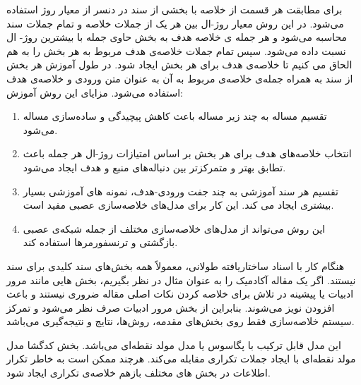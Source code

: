 برای مطابقت هر قسمت از خلاصه با بخشی از سند در دنسر از معیار روژ 
استفاده  ‌می‌شود. در این روش معیار روژ-ال بین هر یک از جملات خلاصه و تمام جملات سند محاسبه می‌شود و هر جمله ی خلاصه هدف به بخش حاوی جمله با بیشترین روژ- ال نسبت داده می‌شود. 
سپس تمام جملات خلاصه‌ی هدف مربوط به هر بخش را به هم الحاق می کنیم تا خلاصه‌ی هدف برای هر بخش ایجاد شود. در طول آموزش هر بخش از سند به همراه جمله‌ی خلاصه‌ی مربوط به آن به عنوان متن ورودی و خلاصه‌ی هدف استفاده می‌شود. 
مزایای این روش آموزش:
\begin{enumerate}
	\item {
		 تقسیم مساله به چند زیر مساله باعث کاهش پیچیدگی و ساده‌سازی مساله می‌شود.
	}
	\item {
		انتخاب خلاصه‌های هدف برای هر بخش بر اساس امتیازات روژ-ال هر جمله باعث تطابق بهتر و متمرکزتر بین دنباله‌های منبع و هدف ایجاد می‌شود.
	}
	\item {
تقسیم هر سند آموزشی به چند جفت ورودی-هدف، نمونه های آموزشی بسیار بیشتری ایجاد می کند. این کار برای مدل‌های خلاصه‌سازی عصبی مفید است. 	
}
	\item {
	این روش می‌تواند از مدل‌های خلاصه‌سازی مختلف از جمله شبکه‌ی عصبی بازگشتی و ترنسفورمرها استفاده کند.
}
\end{enumerate}


هنگام کار با اسناد ساختاریافته طولانی، معمولاً همه بخش‌های سند کلیدی برای سند نیستند. اگر یک مقاله آکادمیک را به عنوان مثال در نظر بگیریم، بخش هایی مانند مرور ادبیات یا پیشینه در تلاش برای خلاصه کردن نکات اصلی مقاله ضروری نیستند و باعث افزودن نویز می‌شوند. بنابراین از بخش مرور ادبیات صرف نظر می‌شود و تمرکز سیستم خلاصه‌سازی فقط  روی بخش‌های مقدمه، روش‌ها، نتایج و نتیجه‌گیری می‌باشد.

این مدل قابل ترکیب با پگاسوس یا مدل مولد نقطه‌ای 
می‌باشد.
بخش کدگشا مدل مولد نقطه‌ای با ایجاد جملات تکراری مقابله ‌می‌کند.
هرچند ممکن است به خاطر تکرار اطلاعات در بخش های مختلف بازهم خلاصه‌ی تکراری ایجاد شود.






